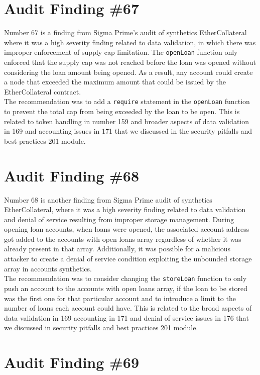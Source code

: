 \section{Audit Finding \#67}

Number 67 is a finding from Sigma Prime's audit of synthetics EtherCollateral where it was a high severity finding related to data validation, in which there was improper enforcement of supply cap limitation. The \verb|openLoan| function only enforced that the supply cap was not reached before the loan was opened without considering the loan amount being opened. As a result, any account could create a node that exceeded the maximum amount that could be issued by the EtherCollateral contract.\\

The recommendation was to add a \verb|require| statement in the \verb|openLoan| function to prevent the total cap from being exceeded by the loan to be open. This is related to token handling in number 159 and broader aspects of data validation in 169 and accounting issues in 171 that we discussed in the security pitfalls and best practices 201 module.

\section{Audit Finding \#68}

Number 68 is another finding from Sigma Prime audit of synthetics EtherCollateral, where it was a high severity finding related to data validation and denial of service resulting from improper storage management. During opening loan accounts, when loans were opened, the associated account address got added to the accounts with open loans array regardless of whether it was already present in that array. Additionally, it was possible for a malicious attacker to create a denial of service condition exploiting the unbounded storage array in accounts synthetics.\\

The recommendation was to consider changing the \verb|storeLoan| function to only push an account to the accounts with open loans array, if the loan to be stored was the first one for that particular account and to introduce a limit to the number of loans each account could have. This is related to the broad aspects of data validation in 169 accounting in 171 and denial of service issues in 176 that we discussed in security pitfalls and best practices 201 module.

\section{Audit Finding \#69}

